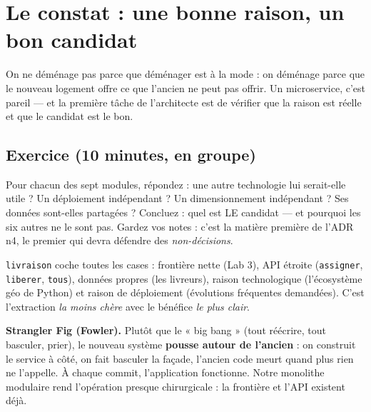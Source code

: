 \documentclass[a4paper,11pt]{article}
\begin{document}
\tableofcontents
\newpage

\section{Le constat : une bonne raison, un bon candidat}

\begin{intuition}
On ne déménage pas parce que déménager est à la mode : on déménage parce
que le nouveau logement offre ce que l'ancien ne peut pas offrir. Un
microservice, c'est pareil --- et la première tâche de l'architecte est de
vérifier que la raison est réelle et que le candidat est le bon.
\end{intuition}

\subsection{Exercice (10 minutes, en groupe)}

Pour chacun des sept modules, répondez : une autre technologie lui
serait-elle utile ? Un déploiement indépendant ? Un dimensionnement
indépendant ? Ses données sont-elles partagées ? Concluez : quel est LE
candidat --- et pourquoi les six autres ne le sont pas. Gardez vos notes :
c'est la matière première de l'ADR n4, le premier qui devra défendre
des \emph{non-décisions}.

\begin{pointcle}
\texttt{livraison} coche toutes les cases : frontière nette (Lab 3), API
étroite (\texttt{assigner}, \texttt{liberer}, \texttt{tous}), données
propres (les livreurs), raison technologique (l'écosystème géo de Python)
et raison de déploiement (évolutions fréquentes demandées). C'est
l'extraction \emph{la moins chère} avec le bénéfice \emph{le plus clair}.
\end{pointcle}

\begin{concept}
\textbf{Strangler Fig (Fowler).} Plutôt que le « big bang » (tout
réécrire, tout basculer, prier), le nouveau système \textbf{pousse autour
de l'ancien} : on construit le service à côté, on fait basculer la façade,
l'ancien code meurt quand plus rien ne l'appelle. À chaque commit,
l'application fonctionne. Notre monolithe modulaire rend l'opération
presque chirurgicale : la frontière et l'API existent déjà.
\end{concept}
\end{document}
